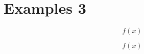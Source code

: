 

\chapter{Examples 3}



\begin{theorem}
\lipsum[2]
\begin{equation}
f(x)
\end{equation}
\end{theorem}


\begin{theorem}
\lipsum[2]
\end{theorem}

\begin{definition}
\lipsum[2]
\end{definition}

\begin{corollary}
\lipsum[2]
\end{corollary}

\begin{proposition}
\lipsum[2]
\begin{equation}
f(x)
\end{equation}
\end{proposition}

\begin{proposition} 
\lipsum[2]
\end{proposition}

